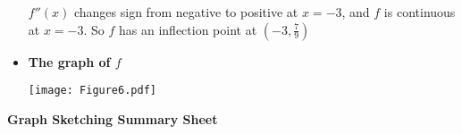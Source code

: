 \documentclass[handout, nooutcomes]{ximera}
\newcommand{\dfn}{\textbf}
\renewenvironment{freeResponse}{
\ifhandout\setbox0\vbox\bgroup\else
\begin{trivlist}\item[\hskip \labelsep\bfseries Solution:\hspace{2ex}]
\fi}
{\ifhandout\egroup\else
\end{trivlist}
\fi}
\begin{document}
\begin{problem}
\begin{freeResponse}
\begin{itemize}
			$f''(x)$ changes sign from negative to positive at $x=-3$, and $f$ is continuous at $x=-3$.  So $f$ has an inflection point at $\left( -3, \frac{7}{9} \right)$
			
\newpage

			\item  \dfn{The graph of $f$}
			
			\begin{image}
			\texttt{[image: Figure6.pdf]}
			\end{image}
			
		\end{itemize}
		
		\end{freeResponse}
		
		
		

\end{problem}









\newpage









\begin{center}  \dfn{Graph Sketching Summary Sheet}  \end{center}
\end{document}
